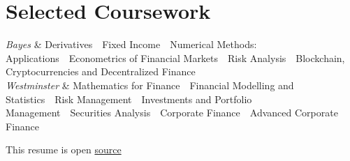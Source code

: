\documentclass[a4paper,11pt]{article}
\makeatletter
\newcommand{\sep}{~\textperiodcentered~}
\newenvironment{labelled}
	{\tabularx{\linewidth}{@{}l@{\hspace{1.2em}}S@{}}}
	{\endtabularx}
\newcommand{\courseworkRow}[2]{\textit{#1} & #2 \\[1pt]}
\makeatother
\begin{document}
	\section{Selected Coursework}
		\begin{itemize}[leftmargin=0.15in, label={}]
			\small{\item{
			{\fontsize{8}{9.5}\selectfont
			\begin{labelled}
				\courseworkRow{Bayes}{Derivatives\sep Fixed Income\sep Numerical Methods: Applications\sep Econometrics of Financial Markets\sep Risk Analysis\sep Blockchain, Cryptocurrencies and Decentralized Finance}
				\courseworkRow{Westminster}{Mathematics for Finance\sep Financial Modelling and Statistics\sep Risk Management\sep Investments and Portfolio Management\sep Securities Analysis\sep Corporate Finance\sep Advanced Corporate Finance}
			\end{labelled}\par}
			}}
		\end{itemize}

		\vfill

	\hfill \tiny This resume is open \href{https://github.com/boomelage/boomelage/blob/master/resume/resume.tex}{source}
\end{document}
